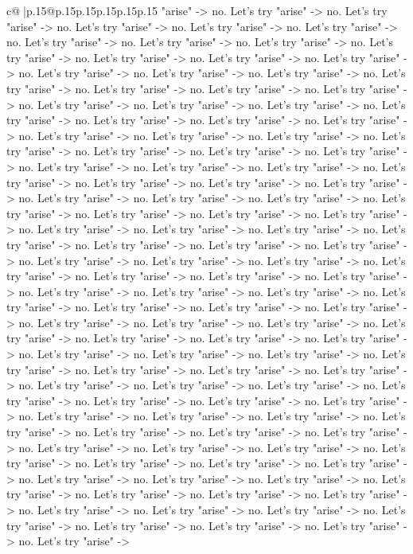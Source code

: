 \documentclass{article}
\begin{document}
{\begin{supertabular}{c@{$\;$}|p{.15\linewidth}@{}p{.15\linewidth}p{.15\linewidth}p{.15\linewidth}p{.15\linewidth}p{.15\linewidth}}
{{{"arise" {-}> no. Let's try "arise" {-}> no. Let's try "arise" {-}> no. Let's try "arise" {-}> no. Let's try "arise" {-}> no. Let's try "arise" {-}> no. Let's try "arise" {-}> no. Let's try "arise" {-}> no. Let's try "arise" {-}> no. Let's try "arise" {-}> no. Let's try "arise" {-}> no. Let's try "arise" {-}> no. Let's try "arise" {-}> no. Let's try "arise" {-}> no. Let's try "arise" {-}> no. Let's try "arise" {-}> no. Let's try "arise" {-}> no. Let's try "arise" {-}> no. Let's try "arise" {-}> no. Let's try "arise" {-}> no. Let's try "arise" {-}> no. Let's try "arise" {-}> no. Let's try "arise" {-}> no. Let's try "arise" {-}> no. Let's try "arise" {-}> no. Let's try "arise" {-}> no. Let's try "arise" {-}> no. Let's try "arise" {-}> no. Let's try "arise" {-}> no. Let's try "arise" {-}> no. Let's try "arise" {-}> no. Let's try "arise" {-}> no. Let's try "arise" {-}> no. Let's try "arise" {-}> no. Let's try "arise" {-}> no. Let's try "arise" {-}> no. Let's try "arise" {-}> no. Let's try "arise" {-}> no. Let's try "arise" {-}> no. Let's try "arise" {-}> no. Let's try "arise" {-}> no. Let's try "arise" {-}> no. Let's try "arise" {-}> no. Let's try "arise" {-}> no. Let's try "arise" {-}> no. Let's try "arise" {-}> no. Let's try "arise" {-}> no. Let's try "arise" {-}> no. Let's try "arise" {-}> no. Let's try "arise" {-}> no. Let's try "arise" {-}> no. Let's try "arise" {-}> no. Let's try "arise" {-}> no. Let's try "arise" {-}> no. Let's try "arise" {-}> no. Let's try "arise" {-}> no. Let's try "arise" {-}> no. Let's try "arise" {-}> no. Let's try "arise" {-}> no. Let's try "arise" {-}> no. Let's try "arise" {-}> no. Let's try "arise" {-}> no. Let's try "arise" {-}> no. Let's try "arise" {-}> no. Let's try "arise" {-}> no. Let's try "arise" {-}> no. Let's try "arise" {-}> no. Let's try "arise" {-}> no. Let's try "arise" {-}> no. Let's try "arise" {-}> no. Let's try "arise" {-}> no. Let's try "arise" {-}> no. Let's try "arise" {-}> no. Let's try "arise" {-}> no. Let's try "arise" {-}> no. Let's try "arise" {-}> no. Let's try "arise" {-}> no. Let's try "arise" {-}> no. Let's try "arise" {-}> no. Let's try "arise" {-}> no. Let's try "arise" {-}> no. Let's try "arise" {-}> no. Let's try "arise" {-}> no. Let's try "arise" {-}> no. Let's try "arise" {-}> no. Let's try "arise" {-}> no. Let's try "arise" {-}> no. Let's try "arise" {-}> no. Let's try "arise" {-}> no. Let's try "arise" {-}> no. Let's try "arise" {-}> no. Let's try "arise" {-}> no. Let's try "arise" {-}> no. Let's try "arise" {-}> no. Let's try "arise" {-}> no. Let's try "arise" {-}> no. Let's try "arise" {-}> no. Let's try "arise" {-}> no. Let's try "arise" {-}> no. Let's try "arise" {-}> no. Let's try "arise" {-}> no. Let's try "arise" {-}> no. Let's try "arise" {-}> no. Let's try "arise" {-}> no. Let's try "arise" {-}> no. Let's try "arise" {-}> no. Let's try "arise" {-}> no. Let's try "arise" {-}> no. Let's try "arise" {-}> no. Let's try "arise" {-}> no. Let's try "arise" {-}> no. Let's try "arise" {-}> no. Let's try "arise" {-}> no. Let's try "arise" {-}> no. Let's try "arise" {-}> no. Let's try "arise" {-}> no. Let's try "arise" {-}> no. Let's try "arise" {-}> no. Let's try "arise" {-}> }}}
\end{supertabular}}
\end{document}
